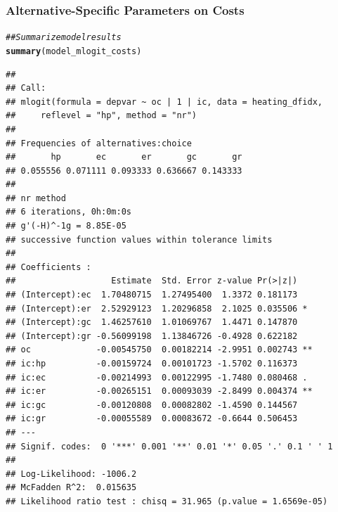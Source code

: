 \documentclass{beamer}\usepackage[]{graphicx}\usepackage[]{color}
\makeatletter
\newcommand{\hlcom}[1]{\textcolor[rgb]{0.678,0.584,0.686}{\textit{#1}}}%
\newcommand{\hlstd}[1]{\textcolor[rgb]{0.345,0.345,0.345}{#1}}%
\newcommand{\hlkwd}[1]{\textcolor[rgb]{0.737,0.353,0.396}{\textbf{#1}}}%
\newenvironment{kframe}{%
 \def\at@end@of@kframe{}%
 \ifinner\ifhmode%
  \def\at@end@of@kframe{\end{minipage}}%
  \begin{minipage}{\columnwidth}%
 \fi\fi%
 \def\FrameCommand##1{\hskip\@totalleftmargin \hskip-\fboxsep
 \colorbox{shadecolor}{##1}\hskip-\fboxsep
     \hskip-\linewidth \hskip-\@totalleftmargin \hskip\columnwidth}%
 \MakeFramed {\advance\hsize-\width
   \@totalleftmargin\z@ \linewidth\hsize
   \@setminipage}}%
 {\par\unskip\endMakeFramed%
 \at@end@of@kframe}
\newenvironment{knitrout}{}{} %
\makeatother
\begin{document}
\begin{frame}[fragile]\frametitle{Alternative-Specific Parameters on Costs}
    \vspace{1ex}
\begin{knitrout}\tiny
{}\color{fgcolor}\begin{kframe}
\begin{alltt}
\hlcom{## Summarize model results}
\hlkwd{summary}\hlstd{(model_mlogit_costs)}
\end{alltt}
\begin{verbatim}
## 
## Call:
## mlogit(formula = depvar ~ oc | 1 | ic, data = heating_dfidx, 
##     reflevel = "hp", method = "nr")
## 
## Frequencies of alternatives:choice
##       hp       ec       er       gc       gr 
## 0.055556 0.071111 0.093333 0.636667 0.143333 
## 
## nr method
## 6 iterations, 0h:0m:0s 
## g'(-H)^-1g = 8.85E-05 
## successive function values within tolerance limits 
## 
## Coefficients :
##                   Estimate  Std. Error z-value Pr(>|z|)   
## (Intercept):ec  1.70480715  1.27495400  1.3372 0.181173   
## (Intercept):er  2.52929123  1.20296858  2.1025 0.035506 * 
## (Intercept):gc  1.46257610  1.01069767  1.4471 0.147870   
## (Intercept):gr -0.56099198  1.13846726 -0.4928 0.622182   
## oc             -0.00545750  0.00182214 -2.9951 0.002743 **
## ic:hp          -0.00159724  0.00101723 -1.5702 0.116373   
## ic:ec          -0.00214993  0.00122995 -1.7480 0.080468 . 
## ic:er          -0.00265151  0.00093039 -2.8499 0.004374 **
## ic:gc          -0.00120808  0.00082802 -1.4590 0.144567   
## ic:gr          -0.00055589  0.00083672 -0.6644 0.506453   
## ---
## Signif. codes:  0 '***' 0.001 '**' 0.01 '*' 0.05 '.' 0.1 ' ' 1
## 
## Log-Likelihood: -1006.2
## McFadden R^2:  0.015635 
## Likelihood ratio test : chisq = 31.965 (p.value = 1.6569e-05)
\end{verbatim}
\end{kframe}
\end{knitrout}
\end{frame}
\end{document}

